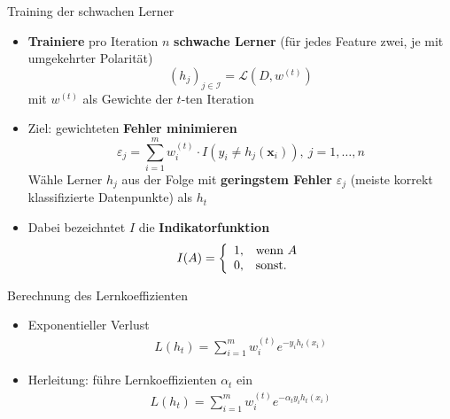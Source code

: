 \documentclass[hyperref={bookmarks=false},11pt,dvipsnames]{beamer}
\begin{document}
\begin{frame}[t]{Training der schwachen Lerner}
	\begin{itemize}
		\item <1-> \textbf{Trainiere} pro Iteration $n$ \textbf{schwache Lerner} (für jedes Feature zwei, je mit umgekehrter Polarität)
		      $$
			      (h_j)_{j\in\mathcal{I}} = \mathcal{L}(D, w^{(t)})
		      $$
		      mit $w^{(t)}$ als Gewichte der $t$-ten Iteration
		\item <2-> Ziel: gewichteten \textbf{Fehler minimieren}
		      $$
			      \varepsilon_j = \sum_{i=1}^m w_i^{(t)}\cdot I\left(y_i \neq h_j\left(\boldsymbol{x}_i\right)\right),~j=1,\dots,n
		      $$
		      Wähle Lerner $h_j$ aus der Folge mit \textbf{geringstem Fehler} $\varepsilon_j$ (meiste korrekt klassifizierte Datenpunkte) als $h_t$
		\item <3-> Dabei bezeichntet $I$ die \textbf{Indikatorfunktion}
		      $$
			      I(A)=\left\{\begin{array}{l l}
				      1, & \text{wenn } A \\
				      0, & \text{sonst.}
			      \end{array}\right.
		      $$
	\end{itemize}
\end{frame}

\begin{frame}[t]{Berechnung des Lernkoeffizienten}
	\begin{itemize}
		\item <1-> Exponentieller Verlust \begin{align*}
			      L(h_t) = \sum_{i=1}^{m} w_i^{(t)}e^{-y_ih_t(x_i)}
		      \end{align*}
		\item <2-> Herleitung: führe Lernkoeffizienten $\alpha_t$ ein \begin{align*}
			      L(h_t)=\sum_{i=1}^{m}w_i^{(t)}e^{-\alpha_ty_ih_t(x_i)}
		      \end{align*}
	\end{itemize}
\end{frame}
\end{document}
